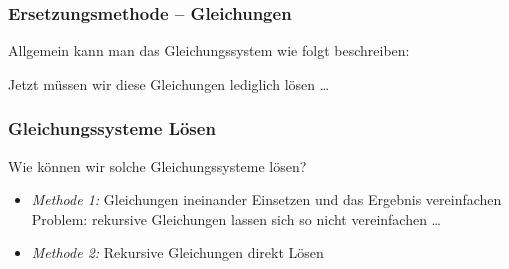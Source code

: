 \documentclass[onlymath]{beamer}
\begin{document}
\begin{frame}\frametitle{Ersetzungsmethode -- Gleichungen}

Allgemein kann man das Gleichungssystem wie folgt beschreiben:\medskip


Jetzt müssen wir diese Gleichungen lediglich lösen \ldots

\end{frame}


\begin{frame}\frametitle{Gleichungssysteme Lösen}


Wie können wir solche Gleichungssysteme lösen?\pause
\begin{itemize}
\item \emph{Methode 1:} Gleichungen ineinander Einsetzen und das Ergebnis vereinfachen\\[1ex]

Problem: rekursive Gleichungen lassen sich so nicht vereinfachen \ldots\pause
\item \emph{Methode 2:} Rekursive Gleichungen direkt Lösen\\
\end{itemize}

\end{frame}
\end{document}
